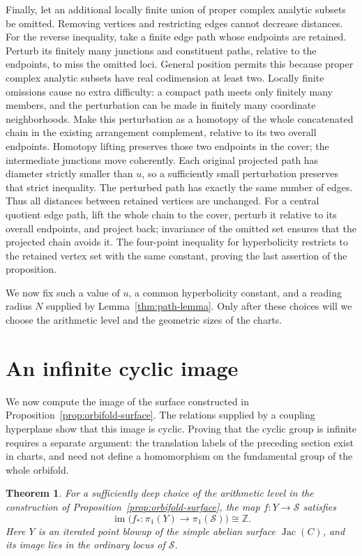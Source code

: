 \documentclass[11pt,reqno]{amsart}
\numberwithin{equation}{section}
\newtheorem{theorem}{Theorem}[section]
\theoremstyle{definition}
\theoremstyle{remark}
\newcommand{\Z}{\mathbb Z}
\newcommand{\cS}{\mathcal S}
\DeclareMathOperator{\im}{im}
\DeclareMathOperator{\Jac}{Jac}
\begin{document}
Finally, let an additional locally finite union of proper complex
analytic subsets be omitted.  Removing vertices and restricting
edges cannot decrease distances.  For the reverse inequality,
take a finite edge path whose endpoints are retained.  Perturb
its finitely many junctions and constituent paths, relative to
the endpoints, to miss the omitted loci.  General position permits
this because proper complex analytic subsets have real codimension
at least two.  Locally finite omissions cause no extra difficulty:
a compact path meets only finitely many members, and the
perturbation can be made in finitely many coordinate neighborhoods.
Make this perturbation as a homotopy of the whole concatenated
chain in the existing arrangement complement, relative to its two
overall endpoints.  Homotopy lifting preserves those two endpoints
in the cover; the intermediate junctions move coherently.  Each
original projected path has diameter strictly smaller than $u$, so a
sufficiently small perturbation preserves that strict inequality.
The perturbed path has exactly the same number of edges.  Thus
all distances between retained vertices are unchanged.  For a
central quotient edge path, lift the whole chain to the cover, perturb it relative to its overall endpoints, and project
back; invariance of the omitted set ensures that the projected
chain avoids it.  The four-point inequality for hyperbolicity
restricts to the retained vertex set with the same constant, proving the
last assertion of the proposition.

We now fix such a value of $u$, a common hyperbolicity constant,
and a reading radius $N$ supplied by Lemma~\ref{thm:path-lemma}.
Only after these choices will we choose the arithmetic level and
the geometric sizes of the charts.

\section{An infinite cyclic image}\label{sec:image}

We now compute the image of the surface constructed in
Proposition~\ref{prop:orbifold-surface}.  The relations supplied by a
coupling hyperplane show that this image is cyclic.  Proving that the
cyclic group is infinite requires a separate argument: the translation
labels of the preceding section exist in charts, and need not define a
homomorphism on the fundamental group of the whole orbifold.

\begin{theorem}\label{thm:orbifold-cyclic}
For a sufficiently deep choice of the arithmetic level in the
construction of Proposition~\ref{prop:orbifold-surface}, the map
$f:Y\longrightarrow\cS$ satisfies
\[
 \im\bigl(f_*:\pi_1(Y)\longrightarrow\pi_1(\cS)\bigr)\cong\Z.
\]
Here $Y$ is an iterated point blowup of the simple abelian surface
$\Jac(C)$, and its image lies in the ordinary locus of $\cS$.
\end{theorem}
\end{document}
